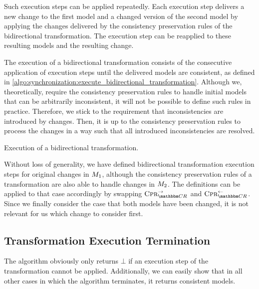 Such execution steps can be applied repeatedly.
Each execution step delivers a new change to the first model and a changed version of the second model by applying the changes delivered by the consistency preservation rules of the bidirectional transformation.
The execution step can be reapplied to these resulting models and the resulting change.

The execution of a bidirectional transformation consists of the consecutive application of execution steps until the delivered models are consistent, as defined in \autoref{algo:synchronization:execute_bidirectional_transformation}.
Although we, theoretically, require the consistency preservation rules to handle initial models that can be arbitrarily inconsistent, it will not be possible to define such rules in practice.
Therefore, we stick to the requirement that inconsistencies are introduced by changes.
Then, it is up to the consistency preservation rules to process the changes in a way such that all introduced inconsistencies are resolved.

\begin{algorithm}
    
    \caption[Execution of a bidirectional transformation]{Execution of a bidirectional transformation.}
    \label{algo:synchronization:execute_bidirectional_transformation}
\end{algorithm}

Without loss of generality, we have defined bidirectional transformation execution steps for original changes in $\metamodel{M}{1}$, although the consistency preservation rules of a transformation are also able to handle changes in $\metamodel{M}{2}$.
The definitions can be applied to that case accordingly by swapping $\consistencypreservationrule{\consistencyrelationset{CR}}^{\rightarrow}$ and $\consistencypreservationrule{\consistencyrelationset{CR}}^{\leftarrow}$.
Since we finally consider the case that both models have been changed, it is not relevant for us which change to consider first.


\subsection{Transformation Execution Termination}

The algorithm obviously only returns $\bot$ if an execution step of the transformation cannot be applied.
Additionally, we can easily show that in all other cases in which the algorithm terminates, it returns consistent models.

